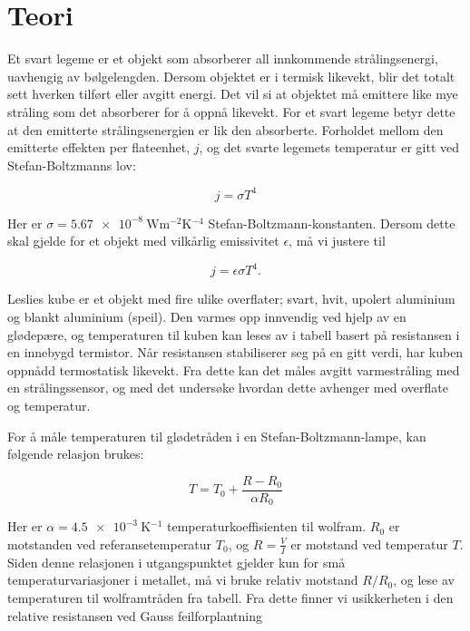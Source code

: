 \section{Teori}
Et svart legeme er et objekt som absorberer all innkommende strålingsenergi, uavhengig av bølgelengden. Dersom objektet er i termisk likevekt, blir det totalt sett hverken tilført eller avgitt energi. Det vil si at objektet må emittere like mye stråling som det absorberer for å oppnå likevekt. For et svart legeme betyr dette at den emitterte strålingsenergien er lik den absorberte. Forholdet mellom den emitterte effekten per flateenhet, $j$, og det svarte legemets temperatur er gitt ved Stefan-Boltzmanns lov:

\begin{equation}
  j = \sigma T^4
\label{eq:SB} %
\end{equation}

Her er $\sigma = \SI{5,67e-8}{\watt\metre^{-2}\kelvin^{-4}}$ Stefan-Boltzmann-konstanten. Dersom dette skal gjelde for et objekt med vilkårlig emissivitet $\epsilon$, må vi justere til

\begin{equation}
  j = \epsilon\sigma T^4.
\label{eq:SBepsilon} %
\end{equation}

Leslies kube er et objekt med fire ulike overflater; svart, hvit, upolert aluminium og blankt aluminium (speil). Den varmes opp innvendig ved hjelp av en glødepære, og temperaturen til kuben kan leses av i tabell basert på resistansen i en innebygd termistor. Når resistansen stabiliserer seg på en gitt verdi, har kuben oppnådd termostatisk likevekt. Fra dette kan det måles avgitt varmestråling med en strålingssensor, og med det undersøke hvordan dette avhenger med overflate og temperatur.

For å måle temperaturen til glødetråden i en Stefan-Boltzmann-lampe, kan følgende relasjon brukes:

\begin{equation}
  T=T_0+\frac{R-R_0}{\alpha R_0}
\label{eq:TempMetall} 
\end{equation}

Her er $\alpha=\SI{4,5e-3}{\kelvin^{-1}}$ temperaturkoeffisienten til wolfram. $R_0$ er motstanden ved referansetemperatur $T_0$, og $R=\frac{V}{I}$ er motstand ved temperatur $T$. Siden denne relasjonen i utgangspunktet gjelder kun for små temperaturvariasjoner i metallet, må vi bruke relativ motstand $R/R_0$, og lese av temperaturen til wolframtråden fra tabell. Fra dette finner vi usikkerheten i den relative resistansen ved Gauss feilforplantning

